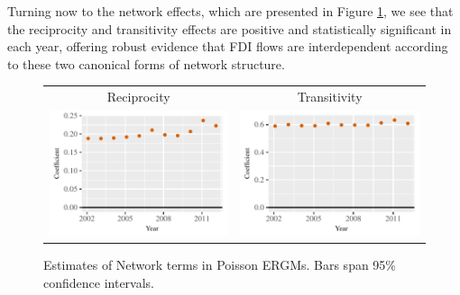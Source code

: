 \documentclass[reqno,onecolumn,letterpaper,12pt]{article}
\begin{document}
Turning now to the network effects, which are presented in Figure \ref{fig:net_effects}, we see that the reciprocity and transitivity effects are positive and statistically significant in each year, offering robust evidence that FDI flows are interdependent according to these two canonical forms of network structure.
\begin{figure}[htp]
\centering
\begin{tabular}{c@{\hskip -.4cm}c}
Reciprocity &
Transitivity\\
\includegraphics[height=.2\textheight, clip=true, trim=0cm .5cm 0cm .1cm]{draft_figures/rl_plots/Mutuality.pdf}    &
\includegraphics[height=.2\textheight, clip=true, trim=.5cm .5cm 0cm .1cm]{draft_figures/rl_plots/Transitivity.pdf}   \\
\end{tabular}
\caption{\label{fig:net_effects} Estimates of Network terms in Poisson ERGMs. Bars span 95\% confidence intervals.}
\end{figure}
\end{document}
